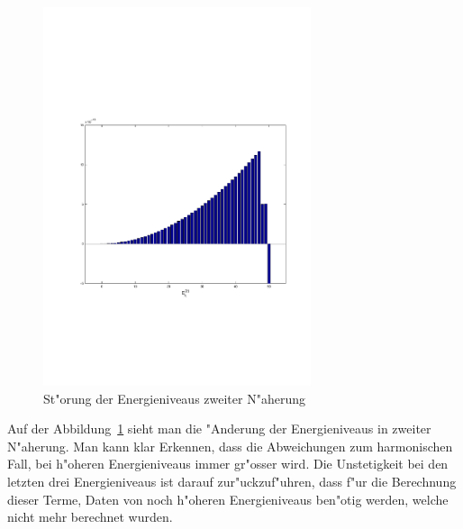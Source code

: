 \begin{refsection}
\begin{figure}[h]	%
\centering
\includegraphics[width=0.7\textwidth]{anharmonisch/images/x3/EK2.pdf}
\caption{St"orung der Energieniveaus zweiter N"aherung
\label{skript:x3_EK2}}
\end{figure}

Auf der Abbildung~\ref{skript:x3_EK2} sieht man die "Anderung der Energieniveaus in zweiter N"aherung. Man kann klar Erkennen, dass die Abweichungen zum harmonischen Fall, bei h"oheren Energieniveaus immer gr"osser wird. Die Unstetigkeit bei den letzten drei Energieniveaus ist darauf zur"uckzuf"uhren, dass f"ur die Berechnung dieser Terme, Daten von noch h"oheren Energieniveaus ben"otig werden, welche nicht mehr berechnet wurden.


\end{refsection}
